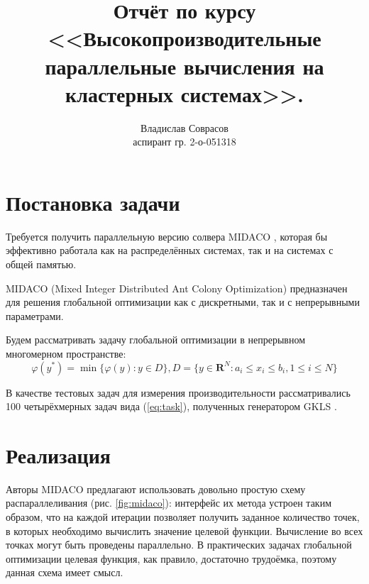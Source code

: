 \documentclass[a4paper]{article}
\begin{document}
\title{Отчёт по курсу <<Высокопроизводительные параллельные вычисления на кластерных системах>>.}
\author{Владислав Соврасов\\ аспирант гр. 2-о-051318}
\date{}
\maketitle

\section{Постановка задачи}

Требуется получить параллельную версию солвера MIDACO \cite{midacoURL}, которая
бы эффективно работала как на распределённых системах, так и на системах с общей памятью.

MIDACO (Mixed Integer Distributed Ant Colony Optimization) предназначен для решения
глобальной оптимизации как с дискретными, так и с непрерывными параметрами.

Будем рассматривать задачу глобальной оптимизации в непрерывном многомерном пространстве:
\begin{displaymath}
\label{eq:task}
\varphi(y^*)=\min\{\varphi(y):y\in D\},D=\{y\in \mathbf{R}^N:a_i\leqslant x_i\leqslant{b_i}, 1\leqslant{i}\leqslant{N}\}
\end{displaymath}

В качестве тестовых задач для измерения производительности рассматривались 100
четырёхмерных задач вида (\ref{eq:task}), полученных генератором GKLS \cite{GKLS}.

\section{Реализация}

Авторы MIDACO предлагают использовать довольно простую схему распараллеливания (рис. \ref{fig:midaco}):
интерфейс их метода устроен таким образом, что на каждой итерации позволяет
получить заданное количество точек, в которых необходимо вычислить значение целевой
функции. Вычисление во всех точках могут быть проведены параллельно. В практических задачах глобальной оптимизации
целевая функция, как правило, достаточно трудоёмка, поэтому данная схема имеет смысл.
\end{document}
